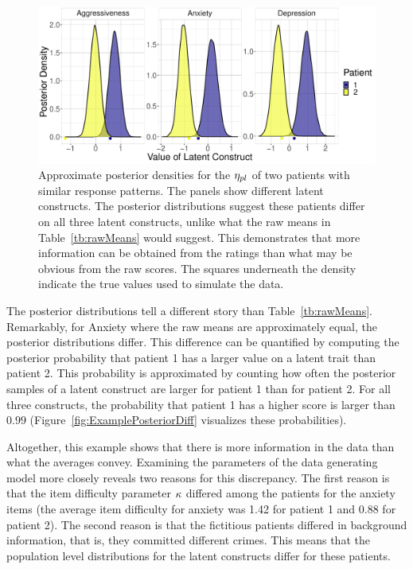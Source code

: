 \documentclass[a4paper,usenames,dvipsnames]{article}
\newenvironment{revisionN}{\color{black}}{\color{black}}
\begin{document}
\begin{figure}[!ht]
	\includegraphics[width=\textwidth]{figures/twoPatientsDensityAndTrueVal.pdf}
	\caption{%
Approximate posterior densities for the \protect\begin{revisionN}$\eta_{pl}$ of\protect\end{revisionN} two patients with similar response patterns.
The panels show different latent constructs.
The posterior distributions suggest these patients differ on all three latent constructs, unlike what the raw means in Table~\ref{tb:rawMeans} would suggest.
This demonstrates that more information can be obtained from the ratings than what may be obvious from the raw scores.
\protect\begin{revisionN}The squares underneath the density indicate the true values used to simulate the data.\protect\end{revisionN}
}
	\label{fig:ExamplePosterior}
\end{figure}
The posterior distributions tell a different story than Table~\ref{tb:rawMeans}. Remarkably, for Anxiety where the raw means are approximately equal, the posterior distributions differ. This difference can be quantified by computing the posterior probability that patient 1 has a larger value on a latent trait than patient 2. This probability is approximated by counting how often the posterior samples of a latent construct are larger for patient 1 than for patient 2. For all three constructs, the probability that patient 1 has a higher score is larger than $0.99$ (Figure~\ref{fig:ExamplePosteriorDiff} visualizes these probabilities).

Altogether, this example shows that there is more information in the data than what the averages convey. Examining the parameters of the data generating model more closely reveals two reasons for this discrepancy. The first reason is that the item difficulty parameter $\kappa$ differed among the patients for the anxiety items (the average item difficulty for anxiety was 1.42 for patient 1 and 0.88 for patient 2). The second reason is that the fictitious patients differed in background information, that is, they committed different crimes. This means that the population level distributions for the latent constructs differ for these patients.
\end{document}
